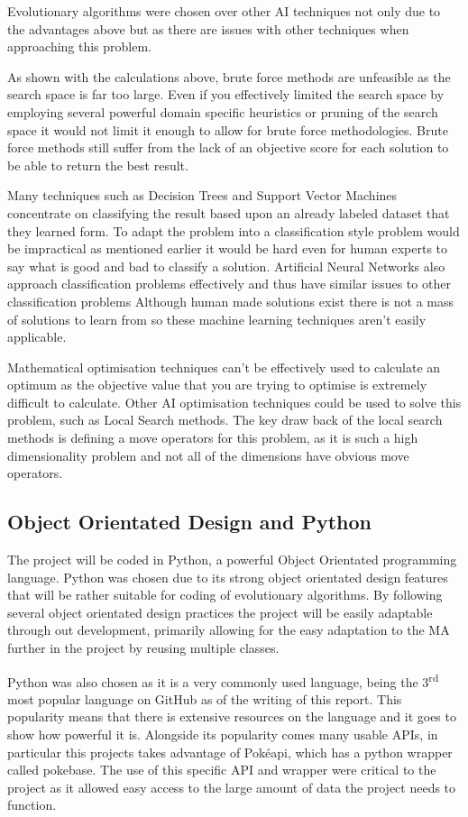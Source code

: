 \documentclass[a4paper]{article}
\newcommand{\Pokeapi}{Pok\'{e}api}
\begin{document}
Evolutionary algorithms were chosen over other AI techniques not only due to the advantages above but as there are issues with other techniques when approaching this problem.
\par
As shown with the calculations above, brute force methods are unfeasible as the search space is far too large.
Even if you effectively limited the search space by employing several powerful domain specific heuristics or pruning of the search space it would not limit it enough to allow for brute force methodologies.
Brute force methods still suffer from the lack of an objective score for each solution to be able to return the best result.
\par
Many techniques such as Decision Trees and Support Vector Machines concentrate on classifying the result based upon an already labeled dataset that they learned form.
To adapt the problem into a classification style problem would be impractical as mentioned earlier it would be hard even for human experts to say what is good and bad to classify a solution.
Artificial Neural Networks also approach classification problems effectively and thus have similar issues to other classification problems
Although human made solutions exist there is not a mass of solutions to learn from so these machine learning techniques aren't easily applicable.
\par
Mathematical optimisation techniques can't be effectively used to calculate an optimum as the objective value that you are trying to optimise is extremely difficult to calculate.
Other AI optimisation techniques could be used to solve this problem, such as Local Search methods.
The key draw back of the local search methods is defining a move operators for this problem, as it is such a high dimensionality problem and not all of the dimensions have obvious move operators.
\subsection{Object Orientated Design and Python}
The project will be coded in Python, a powerful Object Orientated programming language.
Python was chosen due to its strong object orientated design features that will be rather suitable for coding of evolutionary algorithms.
By following several object orientated design practices the project will be easily adaptable through out development, primarily allowing for the easy adaptation to the MA further in the project by reusing multiple classes.
\par
Python was also chosen as it is a very commonly used language, being the 3\textsuperscript{rd} most popular language on GitHub\cite{GitHut} as of the writing of this report.
This popularity means that there is extensive resources on the language and it goes to show how powerful it is.
Alongside its popularity comes many usable APIs, in particular this projects takes advantage of \Pokeapi{}, which has a python wrapper called pokebase. The use of this specific API and wrapper were critical to the project as it allowed easy access to the large amount of data the project needs to function.
\end{document}

